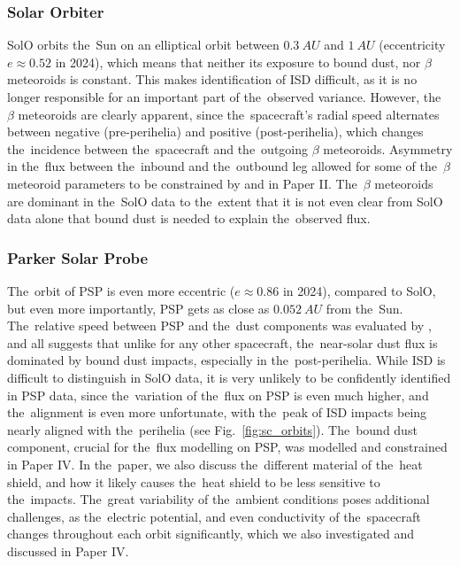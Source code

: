\subsubsection{Solar Orbiter}

SolO orbits the~Sun on an elliptical orbit between $\SI{0.3}{AU}$ and $\SI{1}{AU}$ (eccentricity $e \approx 0.52$ in 2024), which means that neither its exposure to bound dust, nor $\beta$ meteoroids is constant. This makes identification of ISD difficult, as it is no longer responsible for an important part of the~observed variance. However, the~$\beta$ meteoroids are clearly apparent, since the~spacecraft's radial speed alternates between negative (pre-perihelia) and positive (post-perihelia), which changes the~incidence between the~spacecraft and the~outgoing $\beta$ meteoroids. Asymmetry in the~flux between the~inbound and the~outbound leg allowed for some of the~$\beta$ meteoroid parameters to be constrained by \citet{zaslavsky2021first} and in Paper II. The~$\beta$ meteoroids are dominant in the~SolO data to the~extent that it is not even clear from SolO data alone that bound dust is needed to explain the~observed flux.

\subsubsection{Parker Solar Probe}

The~orbit of PSP is even more eccentric ($e \approx 0.86$ in 2024), compared to SolO, but even more importantly, PSP gets as close as $\SI{0.052}{AU}$ from the~Sun. The~relative speed between PSP and the~dust components was evaluated by \citet{szalay2020near}, and all suggests that unlike for any other spacecraft, the~near-solar dust flux is dominated by bound dust impacts, especially in the~post-perihelia. While ISD is difficult to distinguish in SolO data, it is very unlikely to be confidently identified in PSP data, since the~variation of the~flux on PSP is even much higher, and the~alignment is even more unfortunate, with the~peak of ISD impacts being nearly aligned with the~perihelia (see Fig.~\ref{fig:sc_orbits}). The~bound dust component, crucial for the~flux modelling on PSP, was modelled and constrained in Paper IV. In the~paper, we also discuss the~different material of the~heat shield, and how it likely causes the~heat shield to be less sensitive to the~impacts. The~great variability of the~ambient conditions poses additional challenges, as the~electric potential, and even conductivity of the~spacecraft changes throughout each orbit significantly, which we also investigated and discussed in Paper IV.

